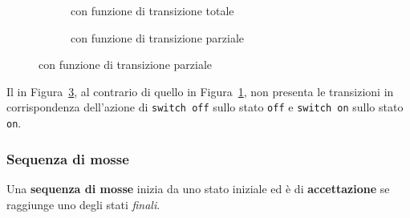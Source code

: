 \documentclass[italian, 10pt]{article}
\begin{document}
\begin{figure}[htbp]
  \bigskip
  \centering
  \begin{subfigure}[t]{0.62\textwidth}
    \centering
    \caption{\FSA con funzione di transizione totale}
    \label{fig:esempio-funzione-transizione-totale-FSA}
  \end{subfigure}
  \begin{subfigure}[t]{0.37\textwidth}
    \centering
    \caption{\FSA con funzione di transizione parziale}
    \label{fig:esempio-funzione-transizione-parziale-FSA}
  \end{subfigure}
  \bigskip
\end{figure}

Il \FSA in Figura~\ref{fig:esempio-funzione-transizione-parziale-FSA}, al contrario di quello in Figura~\ref{fig:esempio-funzione-transizione-totale-FSA}, non presenta le transizioni in corrispondenza dell'azione di \texttt{switch off} sullo stato \texttt{off} e \texttt{switch on} sullo stato \texttt{on}.

\subsubsection{Sequenza di mosse}
\label{sec:sequenza-di-mosse}

Una \textbf{sequenza di mosse} inizia da uno stato iniziale ed è di \textbf{accettazione} se raggiunge uno degli stati \textit{finali}.
\end{document}
